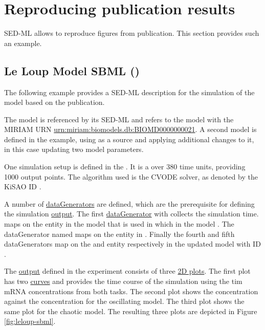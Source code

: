 
\section{Reproducing publication results}
SED-ML allows to reproduce figures from publication. This section provides such an example.

\subsection{Le Loup Model SBML ()}
\label{example:leloup_sbml}
The following example provides a SED-ML description for the simulation of the model based on the publication\cite{LeLoup1999}.

The model is referenced by its SED-ML \hyperref[sec:id]{}  and refers to the model with the MIRIAM URN \url{urn:miriam:biomodels.db:BIOMD0000000021}. A second model is defined in the example, using  as a source and applying additional changes to it, in this case updating two model parameters.

One simulation setup is defined in the . It is a  over 380 time units, providing 1000 output points. The algorithm used is the CVODE solver, as denoted by the KiSAO ID .

A number of \hyperref[class:dataGenerator]{dataGenerators} are defined, which are the prerequisite for defining the simulation \hyperref[class:output]{output}. The first \hyperref[class:dataGenerator]{dataGenerator} with \hyperref[sec:id]{}  collects the simulation time.  maps on the  entity in the model that is used in  which in the model . The dataGenerator named  maps on the  entity in . Finally  the fourth and fifth dataGenerators map on the  and  entity respectively in the updated model with ID .

The \hyperref[class:output]{output} defined in the experiment consists of three \hyperref[class:plot2D]{2D plots}. The first plot has two \hyperref[class:curve]{curves} and provides the time course of the simulation using the tim mRNA concentrations from both tasks. The second plot shows the  concentration against the  concentration for the oscillating model. The third plot shows the same plot for the chaotic model. The resulting three plots are depicted in Figure \ref{fig:leloup-sbml}. 

